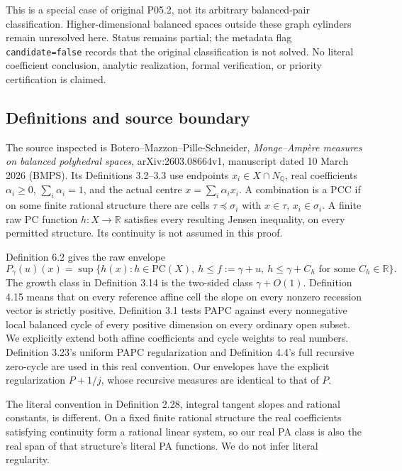 \documentclass[
  11pt,
]{article}
\begin{document}
This is a special case of original P05.2, not its arbitrary
balanced-pair classification. Higher-dimensional balanced spaces outside
these graph cylinders remain unresolved here. Status remains partial; the metadata flag \texttt{candidate=false}
records that the original classification is not solved. No literal
coefficient conclusion, analytic realization, formal verification,
or priority certification is claimed.

\subsection{Definitions and source
boundary}\label{definitions-and-source-boundary}

The source inspected is Botero--Mazzon--Pille-Schneider,
\emph{Monge--Ampère measures on balanced polyhedral spaces},
arXiv:2603.08664v1, manuscript dated 10 March 2026 (BMPS). Its
Definitions 3.2--3.3 use endpoints \(x_i\in X\cap N_{\mathbb{Q}}\), real
coefficients \(\alpha_i\geq0\), \(\sum_i\alpha_i=1\), and the actual
centre \(x=\sum_i\alpha_i x_i\). A combination is a PCC if on some
finite rational structure there are cells \(\tau\preceq\sigma_i\) with
\(x\in\tau\), \(x_i\in\sigma_i\). A finite raw PC function
\(h:X\to\mathbb{R}\) satisfies every resulting Jensen inequality, on
every permitted structure. Its continuity is not assumed in this proof.

Definition 6.2 gives the raw envelope \[
 P_\gamma(u)(x)=\sup\{h(x):h\in\mathrm{PC}(X),\ h\leq f:=\gamma+u,
                 \ h\leq\gamma+C_h\text{ for some }C_h\in\mathbb{R}\}. \tag{3}
\] The growth class in Definition 3.14 is the two-sided class
\(\gamma+O(1)\). Definition 4.15 means that on every reference affine
cell the slope on every nonzero recession vector is strictly positive.
Definition 3.1 tests PAPC against every nonnegative local balanced cycle
of every positive dimension on every ordinary open subset. We explicitly
extend both affine coefficients and cycle weights to real numbers.
Definition 3.23's uniform PAPC regularization and Definition 4.4's full
recursive zero-cycle are used in this real convention. Our envelopes
have the explicit regularization \(P+1/j\), whose recursive measures are
identical to that of \(P\).

The literal convention in Definition 2.28, integral tangent slopes and
rational constants, is different. On a fixed finite rational structure
the real coefficients satisfying continuity form a rational linear
system, so our real PA class is also the real span of that structure's
literal PA functions. We do not infer literal regularity.
\end{document}
